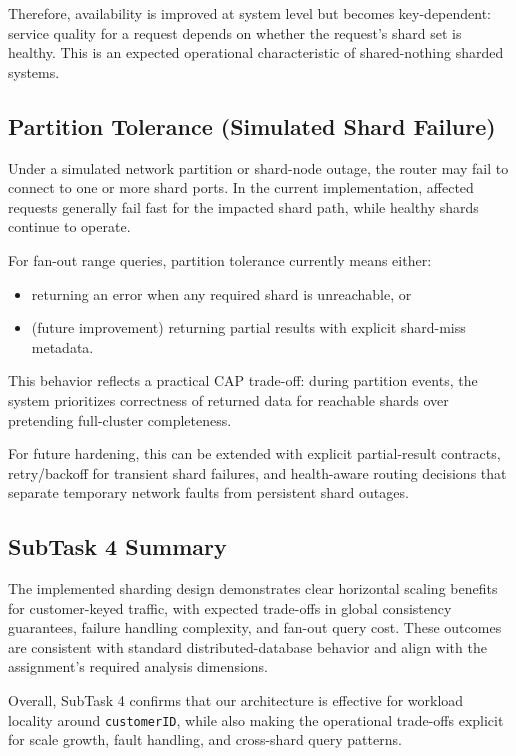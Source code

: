 \documentclass[12pt,a4paper]{article}
\begin{document}
Therefore, availability is improved at system level but becomes key-dependent:
service quality for a request depends on whether the request's shard set is healthy.
This is an expected operational characteristic of shared-nothing sharded systems.

\subsection{Partition Tolerance (Simulated Shard Failure)}

Under a simulated network partition or shard-node outage, the router may fail to
connect to one or more shard ports. In the current implementation, affected requests
generally fail fast for the impacted shard path, while healthy shards continue to
operate.

For fan-out range queries, partition tolerance currently means either:

\begin{itemize}[leftmargin=*]
  \item returning an error when any required shard is unreachable, or
  \item (future improvement) returning partial results with explicit shard-miss metadata.
\end{itemize}

This behavior reflects a practical CAP trade-off: during partition events, the
system prioritizes correctness of returned data for reachable shards over pretending
full-cluster completeness.

For future hardening, this can be extended with explicit partial-result contracts,
retry/backoff for transient shard failures, and health-aware routing decisions
that separate temporary network faults from persistent shard outages.

\subsection{SubTask 4 Summary}

The implemented sharding design demonstrates clear horizontal scaling benefits for
customer-keyed traffic, with expected trade-offs in global consistency guarantees,
failure handling complexity, and fan-out query cost. These outcomes are consistent
with standard distributed-database behavior and align with the assignment's required
analysis dimensions.

Overall, SubTask 4 confirms that our architecture is effective for workload
locality around \texttt{customerID}, while also making the operational trade-offs
explicit for scale growth, fault handling, and cross-shard query patterns.
\end{document}
